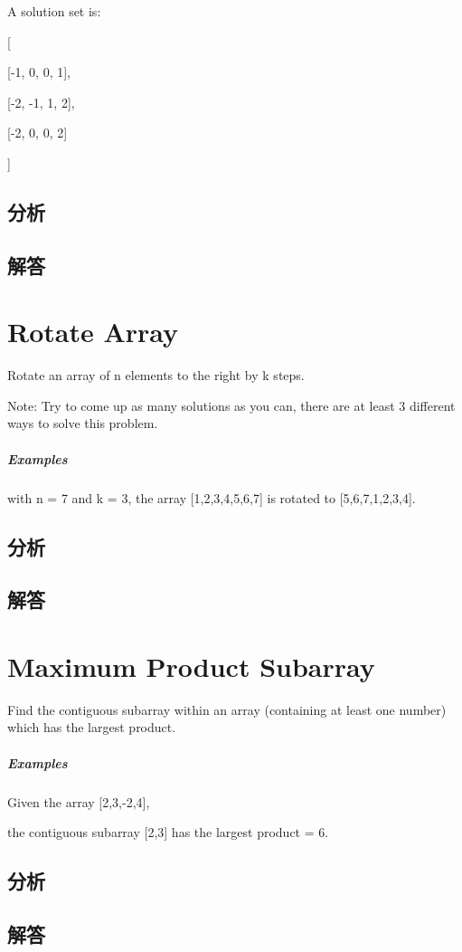 \documentclass[UTF8,a4paper,12pt]{ctexbook}
\begin{document}
		A solution set is:
		
		[
		
		[-1,  0, 0, 1],
		
		[-2, -1, 1, 2],
		
		[-2,  0, 0, 2]
		
		]
	\subsection{分析}
	
	\subsection{解答}
	
	
\section{Rotate Array}
		Rotate an array of n elements to the right by k steps.
		
		Note:
		Try to come up as many solutions as you can, there are at least 3 different ways to solve this problem.
	\subparagraph{Examples}
		with n = 7 and k = 3, the array [1,2,3,4,5,6,7] is rotated to [5,6,7,1,2,3,4].
	\subsection{分析}
	
	\subsection{解答}
	
	
	
\section{Maximum Product Subarray}
		Find the contiguous subarray within an array (containing at least one number) which has the largest product.
		
	\subparagraph{Examples}
			Given the array [2,3,-2,4],
			
			the contiguous subarray [2,3] has the largest product = 6.
	\subsection{分析}
	
	\subsection{解答}
	
\end{document}
